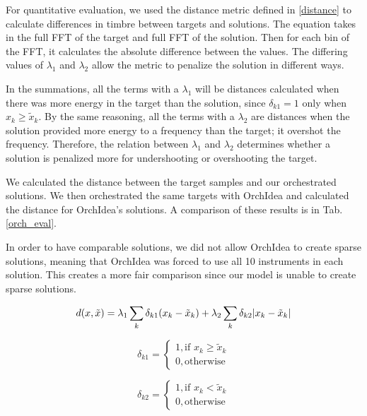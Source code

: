 \documentclass{article}
\begin{document}
For quantitative evaluation, we used the distance metric defined in \eqref{distance} to calculate differences in timbre between targets and solutions. The equation takes in the full FFT of the target and full FFT of the solution. Then for each bin of the FFT, it calculates the absolute difference between the values. The differing values of $\lambda_1$ and $\lambda_2$ allow the metric to penalize the solution in different ways. 

In the summations, all the terms with a $\lambda_1$ will be distances calculated when there was more energy in the target than the solution, since $\delta_{k1} = 1$ only when $x_k \ge \tilde{x}_k$. By the same reasoning, all the terms with a $\lambda_2$ are distances when the solution provided more energy to a frequency than the target; it overshot the frequency. Therefore, the relation between $\lambda_1$ and $\lambda_2$ determines whether a solution is penalized more for undershooting or overshooting the target.

We calculated the distance between the target samples and our orchestrated solutions. We then orchestrated the same targets with OrchIdea and calculated the distance for OrchIdea's solutions. A comparison of these results is in Tab. \ref{orch_eval}.

In order to have comparable solutions, we did not allow OrchIdea to create sparse solutions, meaning that OrchIdea was forced to use all 10 instruments in each solution. This creates a more fair comparison since our model is unable to create sparse solutions.

\begin{equation}\label{distance}
d(x, \tilde{x}) =\lambda_1 \sum_k \delta_{k1}(x_k - \tilde{x}_k) + \lambda_2 \sum_k \delta_{k2}|x_k - \tilde{x	}_k| \\
\end{equation}

\begin{equation}
\delta_{k1} = 
\begin{cases}
1, \text{if   } x_k \ge \tilde{x}_k \\
0, \text{otherwise}
\end{cases} 
\end{equation}

\begin{equation}
\delta_{k2} = 
\begin{cases}
1, \text{if   } x_k < \tilde{x}_k \\
0, \text{otherwise}
\end{cases}
\end{equation}
\end{document}
